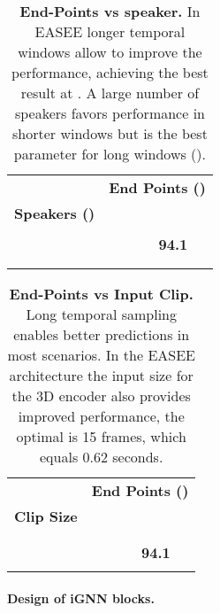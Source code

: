 \documentclass[10pt,twocolumn,letterpaper]{article}
\begin{document}
\begin{table}[t]
    \centering
    \begin{tabular}{ r | c c c c c}
        \toprule
        & \multicolumn{5}{c}{ \textbf{End Points ()} } \\
        \textbf{Speakers ()} &  \quad &  \quad&  \quad&  &  \quad\\ 
        \midrule
             \quad  &  &  &  &  &     \\
             \quad  &  &  &  & \textbf{94.1} &    \\ 
             \quad  &  &  &  &  &    \\ 
             \quad  &  &  &  &  &     \\ 
        \bottomrule
    \end{tabular}
    \caption{
        \textbf{End-Points vs speaker.} In EASEE longer temporal windows allow to improve the performance, achieving the best result at . A large number of speakers favors performance in shorter windows but  is the best parameter for long windows ().
    }
    \label{tab:speakers_1}
\end{table}
 \begin{table}[t]
    \centering
    \begin{tabular}{ r | c c c c c}
        \toprule
        & \multicolumn{5}{c}{ \textbf{End Points ()} } \\
        \textbf{Clip Size} &  \quad &  \quad &  \quad &  \quad&  \quad\\ 
        \midrule
    
  \quad  &  &  &  &  & \\ 
          \quad  &  &  &  &  &   \\ 
          \quad  &  &  &  & \textbf{94.1} &    \\ 
          \quad  &  &  &  &  &  \\ 
        \bottomrule
    \end{tabular}
    \caption{ 
        \textbf{End-Points vs Input Clip.} Long temporal sampling enables better predictions in most scenarios. In the EASEE architecture the input size for the 3D encoder also provides improved performance, the optimal is 15 frames, which equals 0.62 seconds.  
    }
    \label{tab:clip_1}
\end{table}
 
\paragraph{Design of iGNN blocks.}
\end{document}
